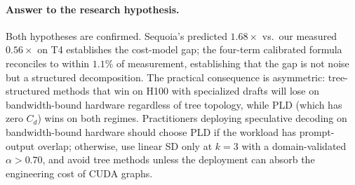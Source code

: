 \documentclass[letterpaper,twocolumn,10pt]{article}
\begin{document}
\paragraph{Answer to the research hypothesis.}
Both hypotheses are confirmed.
Sequoia's predicted $1.68\times$ vs.\ our measured $0.56\times$ on T4 establishes the cost-model gap; the four-term calibrated formula reconciles to within $1.1\%$ of measurement, establishing that the gap is not noise but a structured decomposition.
The practical consequence is asymmetric: tree-structured methods that win on H100 with specialized drafts will lose on bandwidth-bound hardware regardless of tree topology, while PLD (which has zero $C_d$) wins on both regimes.
Practitioners deploying speculative decoding on bandwidth-bound hardware should choose PLD if the workload has prompt-output overlap; otherwise, use linear SD only at $k = 3$ with a domain-validated $\alpha > 0.70$, and avoid tree methods unless the deployment can absorb the engineering cost of CUDA graphs.
\end{document}
